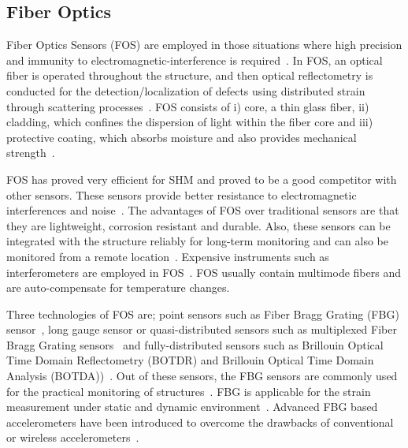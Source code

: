 \documentclass[b5paper, 11pt, titlepage]{book}
\begin{document}
\subsection{Fiber Optics}
Fiber Optics Sensors (FOS) are employed in those situations where high precision and immunity to electromagnetic-interference is required~\cite{li2018fiber}. In FOS, an optical fiber is operated throughout the structure, and then optical reflectometry is conducted for the detection/localization of defects using distributed strain through scattering processes~\cite{warsi2019sensors}. 
FOS consists of i) core, a thin glass fiber, ii) cladding, which confines the dispersion of light within the fiber core and iii) protective coating, which absorbs moisture and also provides mechanical strength~\cite{Torres2011}.

FOS has proved very efficient for SHM and proved to be a good competitor with other sensors. These sensors provide better resistance to electromagnetic interferences and noise~\cite{Das2018}. The advantages of FOS over traditional sensors are that they are lightweight, corrosion resistant and durable. Also, these sensors can be integrated with the structure reliably for long-term monitoring and can also be monitored from a remote location~\cite{casas2003fiber, Majumder2008}. Expensive instruments such as interferometers are employed in FOS~\cite{warsi2019sensors}. FOS usually contain multimode fibers and are auto-compensate for temperature changes. 

Three technologies of FOS are; point sensors such as Fiber Bragg Grating (FBG) sensor~\cite{Li2004}, long gauge sensor or quasi-distributed sensors such as multiplexed Fiber Bragg Grating sensors~\cite{Delepine-Lesoille2006} and fully-distributed sensors such as Brillouin Optical Time Domain Reflectometry (BOTDR) and Brillouin Optical Time Domain Analysis
(BOTDA))~\cite{bourne2009energy}. Out of these sensors, the FBG sensors are commonly used for the practical monitoring of structures~\cite{Majumder2008}. FBG is applicable for the strain measurement under static and dynamic environment~\cite{jawaid2018structural}. Advanced FBG based accelerometers have been introduced to overcome the drawbacks of conventional or wireless accelerometers~\cite{Majumder2008}.
\end{document}

